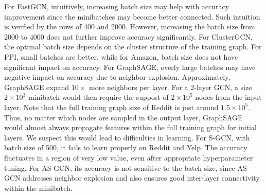 For FastGCN, intuitively, increasing batch size may help with accuracy improvement since the minibatches may become better connected. 
Such intuition is verified by the rows of 400 and 2000. However, increasing the batch size from 2000 to 4000 does not further improve accuracy significantly. 
For ClusterGCN, the optimal batch size depends on the cluster structure of the training graph. For PPI, small batches are better, while for Amazon, batch size does not have significant impact on accuracy. 
For GraphSAGE, overly large batches may have negative impact on accuracy due to neighbor explosion. Approximately, GraphSAGE expand $10\times$ more neighbors per layer. For a 2-layer GCN, a size $2\times 10^3$ minibatch would then require the support of $2\times 10^5$ nodes from the input layer. Note that the full training graph size of Reddit is just around $1.5\times 10^5$. Thus, no matter which nodes are sampled in the output layer, GraphSAGE would almost always propagate features within the full training graph for initial layers. We suspect this would lead to difficulties in learning.
For S-GCN, with batch size of 500, it fails to learn properly on Reddit and Yelp. The accuracy fluctuates in a region of very low value, even after appropriate hyperparameter tuning. 
For AS-GCN, its accuracy is not sensitive to the batch size, since AS-GCN addresses neighbor explosion and also ensures good inter-layer connectivity within the minibatch. 


